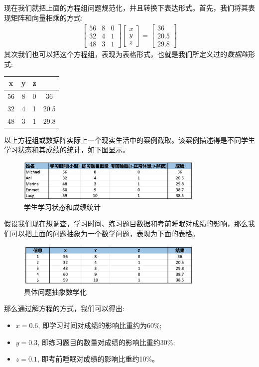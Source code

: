 \documentclass[12pt]{article}
\numberwithin{figure}{section}
\numberwithin{equation}{section}
\begin{document}
现在我们就把上面的方程组问题规范化，并且转换下表达形式。首先，我们将其表现矩阵和向量相乘的方式:
\begin{align*}
	\begin{bmatrix}
		56 & 8 & 0 \\
		32 & 4 & 1 \\
		48 & 3 & 1 
	\end{bmatrix} \begin{bmatrix}
		x \\
		y \\
		z 
	\end{bmatrix} = \begin{bmatrix}
		36 \\
		20.5 \\
		29.8 
	\end{bmatrix}
\end{align*}
其次我们也可以把这个方程组，表现为表格形式，也就是我们所定义过的\textit{数据阵}形式:
\begin{table}[H]
	\centering
	\begin{tabular}{cccc}
	\hline 
		x & y & z & \\
		\hline 
		56 & 8 & 0 & 36 \\
		32 & 4 & 1 & 20.5 \\
		48 & 3 & 1 & 29.8 \\
		\hline 
	\end{tabular}
\end{table}

以上方程组或数据阵实际上一个现实生活中的案例截取。该案例描述得是不同学生学习状态和其成绩的统计，如下图显示。
\begin{figure}[H]
	\centering
	\includegraphics[width=0.8\textwidth]{fig/C1C2grade}
	\caption{学生学习状态和成绩统计}
\end{figure}

假设我们现在想调查，学习时间、练习题目数据和考前睡眠对成绩的影响，那么我们可以把上面的问题抽象为一个数学问题，表现为下面的表格。
\begin{figure}[H]
	\centering
	\includegraphics[width=0.8\textwidth]{fig/C1C2gradeMath}
	\caption{具体问题抽象数学化}
\end{figure}
那么通过解方程的方式，我们可以得出:
\begin{itemize}
	\item $x = 0.6$, 即学习时间对成绩的影响比重约为60\%;
	\item $y = 0.3$, 即练习题目的数量对成绩的影响比重约30\%;
	\item $z= 0.1$, 即考前睡眠对成绩的影响比重约10\%。
\end{itemize}
\end{document}
